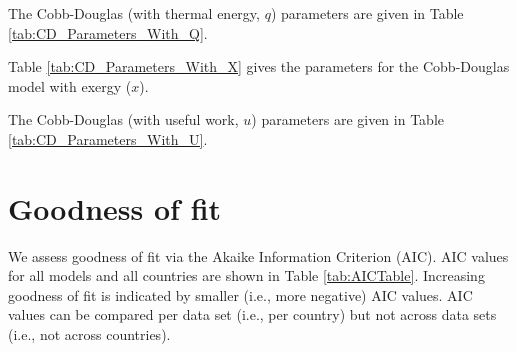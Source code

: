 \documentclass[preprint,authoryear,12pt]{elsarticle}\usepackage{graphicx, color}
\begin{document}
The Cobb-Douglas (with thermal energy, $q$) parameters are given in Table \ref{tab:CD_Parameters_With_Q}.




Table \ref{tab:CD_Parameters_With_X} gives the parameters for the Cobb-Douglas model with exergy ($x$).




The Cobb-Douglas (with useful work, $u$) parameters are given in Table \ref{tab:CD_Parameters_With_U}.




\section{Goodness of fit}
\setcounter{table}{0} %




We assess goodness of fit via the Akaike Information Criterion (AIC). AIC values for all models and all countries are shown in Table \ref{tab:AICTable}. Increasing goodness of fit is indicated by smaller (i.e., more negative) AIC values. AIC values can be compared per data set (i.e., per country) but not across data sets (i.e., not across countries). 





\end{document}
